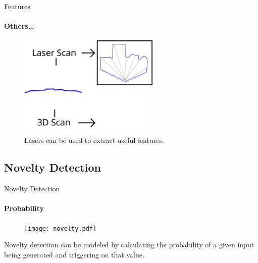 \documentclass[compress]{beamer}
\begin{document}
\begin{frame}{Features}
\framesubtitle{Others\dots}
    \begin{figure}
    \includegraphics[width=0.60\textwidth]{laser_and_depth_input}
    \caption{Lasers can be used to extract useful features.}
    \end{figure}
\end{frame}

\subsection{Novelty Detection}
\begin{frame}{Novelty Detection}
\framesubtitle{Probability}
    \begin{figure}
        \texttt{[image: novelty.pdf]}
    \end{figure}
    Novelty detection can be modeled by calculating the probability of a given input being generated and triggering on that value\cite{bishop1994novelty}.
\end{frame}
\end{document}
